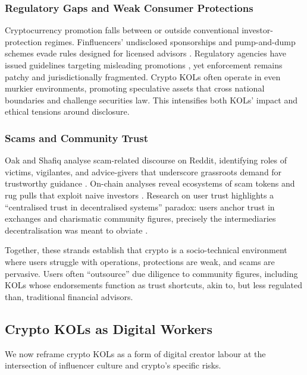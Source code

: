 \subsubsection{Regulatory Gaps and Weak Consumer Protections}

Cryptocurrency promotion falls between or outside conventional investor-protection regimes. Finfluencers' undisclosed sponsorships and pump-and-dump schemes evade rules designed for licensed advisors \cite{StefanouFinfluencersReg2022}. Regulatory agencies have issued guidelines targeting misleading promotions \cite{SECInvestorCrypto,FCA2023Finfluencer,ASAInfluencer2023}, yet enforcement remains patchy and jurisdictionally fragmented. Crypto KOLs often operate in even murkier environments, promoting speculative assets that cross national boundaries and challenge securities law. This intensifies both KOLs' impact and ethical tensions around disclosure.

\subsubsection{Scams and Community Trust}

Oak and Shafiq analyse scam-related discourse on Reddit, identifying roles of victims, vigilantes, and advice-givers that underscore grassroots demand for trustworthy guidance \cite{OakScamReddit2025}. On-chain analyses reveal ecosystems of scam tokens and rug pulls that exploit naive investors \cite{Cernera2023rugpulls}. Research on user trust highlights a ``centralised trust in decentralised systems'' paradox: users anchor trust in exchanges and charismatic community figures, precisely the intermediaries decentralisation was meant to obviate \cite{KhairuddinBitcoinMotivations2016,SasKhairuddin2017,BappyCentralizedTrust2025}.

Together, these strands establish that crypto is a socio-technical environment where users struggle with operations, protections are weak, and scams are pervasive. Users often ``outsource'' due diligence to community figures, including KOLs whose endorsements function as trust shortcuts, akin to, but less regulated than, traditional financial advisors.

\subsection{Crypto KOLs as Digital Workers}

We now reframe crypto KOLs as a form of digital creator labour at the intersection of influencer culture and crypto's specific risks.

